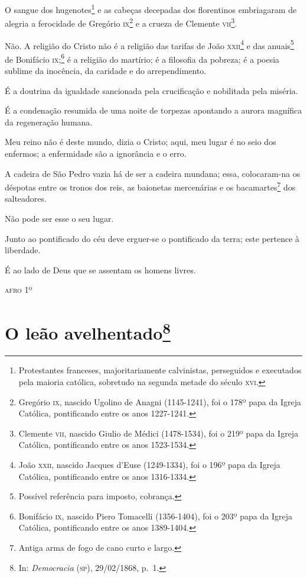 O sangue dos hugenotes\footnote{Protestantes franceses,
  majoritariamente calvinistas, perseguidos e executados pela maioria
  católica, sobretudo na segunda metade do século \textsc{xvi}.} e as cabeças
decepadas dos florentinos embriagaram de alegria a ferocidade de
Gregório \textsc{ix}\footnote{Gregório \textsc{ix}, nascido Ugolino de Anagni
  (1145-1241), foi o 178º papa da Igreja Católica, pontificando entre os
  anos 1227-1241.} e a crueza de Clemente \textsc{vii}\footnote{Clemente \textsc{vii},
  nascido Giulio de Médici (1478-1534), foi o 219º papa da Igreja
  Católica, pontificando entre os anos 1523-1534.}.

Não. A religião do Cristo não é a religião das tarifas de João
\textsc{xxii}\footnote{João \textsc{xxii}, nascido Jacques d'Euse (1249-1334), foi o
  196º papa da Igreja Católica, pontificando entre os anos 1316-1334.} e
das anuais\footnote{Possível referência para imposto, cobrança.} de
Bonifácio \textsc{ix};\footnote{Bonifácio \textsc{ix}, nascido Piero Tomacelli
  (1356-1404), foi o 203º papa da Igreja Católica, pontificando entre os
  anos 1389-1404.} é a religião do martírio; é a filosofia da pobreza;
é a poesia sublime da inocência, da caridade e do arrependimento.

É a doutrina da igualdade sancionada pela crucificação e nobilitada pela
miséria.

É a condenação resumida de uma noite de torpezas apontando a aurora
magnífica da regeneração humana.

Meu reino não é deste mundo, dizia o Cristo; aqui, meu lugar é no seio
dos enfermos; a enfermidade são a ignorância e o erro.

A cadeira de São Pedro vazia há de ser a cadeira mundana; essa,
colocaram-na os déspotas entre os tronos dos reis, as baionetas
mercenárias e os bacamartes\footnote{Antiga arma de fogo de cano curto
  e largo.} dos salteadores.

Não pode ser esse o seu lugar.

Junto ao pontificado do céu deve erguer-se o pontificado da terra; este
pertence à liberdade.

É ao lado de Deus que se assentam os homens livres.
\begin{flushright}
\textsc{afro} 1º
\end{flushright}
\chapter{O leão avelhentado\footnote{In: \emph{Democracia} (\textsc{sp}),
  29/02/1868, p.~1.}}

